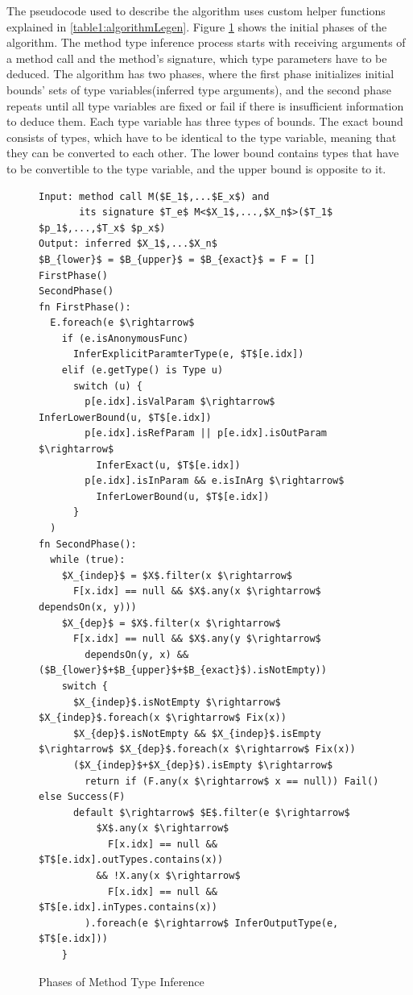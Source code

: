 \par
The pseudocode used to describe the algorithm uses custom helper functions explained in \ref{table1:algorithmLegen}. 
Figure \ref{img10:methodTypeInference1} shows the initial phases of the algorithm. 
The method type inference process starts with receiving arguments of a method call and the method’s signature, which type parameters have to be deduced. 
The algorithm has two phases, where the first phase initializes initial bounds’ sets of type variables(inferred type arguments), and the second phase repeats until all type variables are fixed or fail if there is insufficient information to deduce them. 
Each type variable has three types of bounds. 
The exact bound consists of types, which have to be identical to the type variable, meaning that they can be converted to each other. 
The lower bound contains types that have to be convertible to the type variable, and the upper bound is opposite to it.
\begin{figure}[h!]
\begin{lstlisting}[style=myAlgo, mathescape=true]
Input: method call M($E_1$,...$E_x$) and 
       its signature $T_e$ M<$X_1$,...,$X_n$>($T_1$ $p_1$,...,$T_x$ $p_x$)
Output: inferred $X_1$,...$X_n$
$B_{lower}$ = $B_{upper}$ = $B_{exact}$ = F = []
FirstPhase()
SecondPhase()
fn FirstPhase():
  E.foreach(e $\rightarrow$  
    if (e.isAnonymousFunc)
      InferExplicitParamterType(e, $T$[e.idx])
    elif (e.getType() is Type u)
      switch (u) {
        p[e.idx].isValParam $\rightarrow$ InferLowerBound(u, $T$[e.idx])
        p[e.idx].isRefParam || p[e.idx].isOutParam $\rightarrow$ 
          InferExact(u, $T$[e.idx])
        p[e.idx].isInParam && e.isInArg $\rightarrow$ 
          InferLowerBound(u, $T$[e.idx])
      }
  )
fn SecondPhase():
  while (true):
    $X_{indep}$ = $X$.filter(x $\rightarrow$ 
      F[x.idx] == null && $X$.any(x $\rightarrow$ dependsOn(x, y)))
    $X_{dep}$ = $X$.filter(x $\rightarrow$
      F[x.idx] == null && $X$.any(y $\rightarrow$ 
        dependsOn(y, x) && ($B_{lower}$+$B_{upper}$+$B_{exact}$).isNotEmpty))
    switch {
	  $X_{indep}$.isNotEmpty $\rightarrow$ $X_{indep}$.foreach(x $\rightarrow$ Fix(x))     
	  $X_{dep}$.isNotEmpty && $X_{indep}$.isEmpty $\rightarrow$ $X_{dep}$.foreach(x $\rightarrow$ Fix(x))
	  ($X_{indep}$+$X_{dep}$).isEmpty $\rightarrow$ 
	    return if (F.any(x $\rightarrow$ x == null)) Fail() else Success(F)
	  default $\rightarrow$ $E$.filter(e $\rightarrow$ 
	      $X$.any(x $\rightarrow$ 
	        F[x.idx] == null && $T$[e.idx].outTypes.contains(x)) 
	      && !X.any(x $\rightarrow$ 
	        F[x.idx] == null && $T$[e.idx].inTypes.contains(x))
	    ).foreach(e $\rightarrow$ InferOutputType(e, $T$[e.idx]))
    }
\end{lstlisting}
\caption{Phases of Method Type Inference}
\label{img10:methodTypeInference1}
\end{figure}
